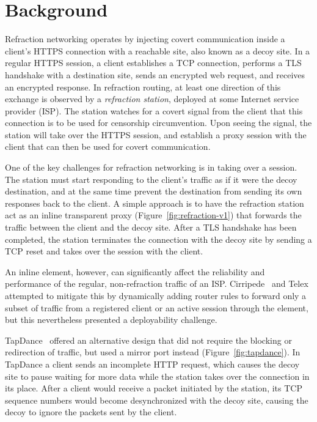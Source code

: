 \section{Background}

Refraction networking operates by injecting covert communication inside a
client's HTTPS connection with a reachable site, also known as a decoy site. In
a regular HTTPS session, a client establishes a TCP connection, performs a TLS
handshake with a destination site, sends an encrypted web request, and
receives an encrypted response. In refraction routing, at least one direction
of this exchange is observed by a \emph{refraction station}, deployed at
some Internet service provider (ISP). The station watches for a covert signal from
the client that this connection is to be used for censorship circumvention.
Upon seeing the signal, the station will take over the HTTPS session,
and establish a proxy session with the client that can then be used for covert
communication.

\FigEvolution

One of the key challenges for refraction networking is in taking over a session. The station must start responding to the client's traffic as if it were the decoy destination, and at the same time prevent the destination from sending its own responses back to the client. A simple approach is to have the refraction station act as an inline transparent proxy (Figure~\ref{fig:refraction-v1}) that forwards the traffic between the client and the decoy site. After a TLS handshake has been completed, the station terminates the connection with the decoy site by sending a TCP reset and takes over the session with the client.

An inline element, however, can significantly affect the reliability and performance of the regular, non-refraction traffic of an ISP. Cirripede~\cite{cirripede11} and Telex~\cite{telex11} attempted to mitigate this by dynamically adding router rules to forward only a subset of traffic from a registered client or an active session through the element, but this nevertheless presented a deployability challenge.

TapDance~\cite{tapdance14} offered an alternative design that did not require the blocking or redirection of traffic, but used a mirror port instead (Figure~\ref{fig:tapdance}). In TapDance a client sends an incomplete HTTP request, which causes the decoy site to pause waiting for more data while the station takes over the connection in its place. After a client would receive a packet initiated by the station, its TCP sequence numbers would become desynchronized with the decoy site, causing the decoy to ignore the packets sent by the client.

